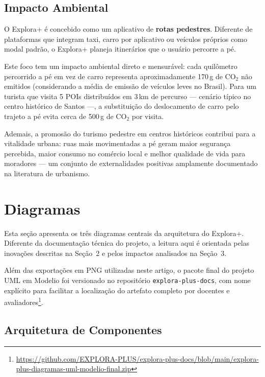 \documentclass[12pt, a4paper]{article}
\begin{document}
\subsection{Impacto Ambiental}

O Explora+ \'e concebido como um aplicativo de \textbf{rotas pedestres}. Diferente de plataformas que integram taxi, carro por aplicativo ou ve\'iculos pr\'oprios como modal padr\~ao, o Explora+ planeja itiner\'arios que o usu\'ario percorre a p\'e.

Este foco tem um impacto ambiental direto e mensur\'avel: cada quilômetro percorrido a p\'e em vez de carro representa aproximadamente 170\,g de CO$_2$ n\~ao emitidos (considerando a m\'edia de emiss\~ao de ve\'iculos leves no Brasil). Para um turista que visita 5 POIs distribu\'idos em 3\,km de percurso --- cen\'ario t\'ipico no centro hist\'orico de Santos ---, a substitui\c{c}\~ao do deslocamento de carro pelo trajeto a p\'e evita cerca de 500\,g de CO$_2$ por visita.

Ademais, a promos\~ao do turismo pedestre em centros hist\'oricos contribui para a vitalidade urbana: ruas mais movimentadas a p\'e geram maior seguran\c{c}a percebida, maior consumo no com\'ercio local e melhor qualidade de vida para moradores --- um conjunto de externalidades positivas amplamente documentado na literatura de urbanismo.

\section{Diagramas}

Esta se\c{c}\~ao apresenta os tr\^es diagramas centrais da arquitetura do Explora+. Diferente da documenta\c{c}\~ao t\'ecnica do projeto, a leitura aqui \'e orientada pelas inova\c{c}\~oes descritas na Se\c{c}\~ao~2 e pelos impactos analisados na Se\c{c}\~ao~3.

Al\'em das exporta\c{c}\~oes em PNG utilizadas neste artigo, o pacote final do projeto UML em Modelio foi versionado no reposit\'orio \texttt{explora-plus-docs}, com nome expl\'icito para facilitar a localiza\c{c}\~ao do artefato completo por docentes e avaliadores\footnote{\url{https://github.com/EXPLORA-PLUS/explora-plus-docs/blob/main/explora-plus-diagramas-uml-modelio-final.zip}}.

\subsection{Arquitetura de Componentes}
\end{document}
